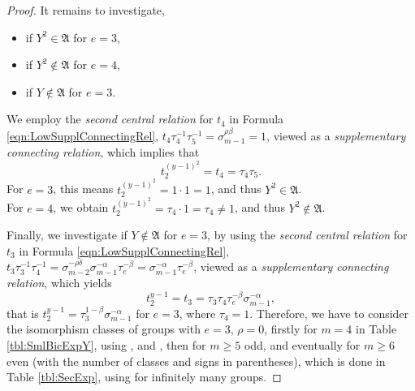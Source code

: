 \documentclass{amsart}
\theoremstyle{definition}
\numberwithin{equation}{section}
\begin{document}
\begin{proof}
It remains to investigate,

\begin{itemize}
\item
if \(Y^2\in\mathfrak{A}\) for \(e=3\),
\item
if \(Y^2\not\in\mathfrak{A}\) for \(e=4\),
\item
if \(Y\not\in\mathfrak{A}\) for \(e=3\).
\end{itemize}

\noindent
We employ the \textit{second central relation} for \(t_4\) in Formula
\eqref{eqn:LowSupplConnectingRel},
\(t_4\tau_4^{-1}\tau_5^{-1}=\sigma_{m-1}^{\rho\beta}=1\),
viewed as a \textit{supplementary connecting relation},
which implies that
\[t_2^{(y-1)^2}=t_4=\tau_4\tau_5.\]
For \(e=3\), this means
\(t_2^{(y-1)^2}=1\cdot 1=1\), and thus \(Y^2\in\mathfrak{A}\).\\
For \(e=4\), we obtain
\(t_2^{(y-1)^2}=\tau_4\cdot 1=\tau_4\ne 1\), and thus \(Y^2\not\in\mathfrak{A}\).

\noindent
Finally, we investigate
if \(Y\not\in\mathfrak{A}\) for \(e=3\),
by using the \textit{second central relation} for \(t_3\) in Formula
\eqref{eqn:LowSupplConnectingRel},
\(t_3\tau_3^{-1}\tau_4^{-1}=\sigma_{m-2}^{-\rho\delta}\sigma_{m-1}^{-\alpha}\tau_e^{-\beta}=\sigma_{m-1}^{-\alpha}\tau_e^{-\beta}\),
viewed as a \textit{supplementary connecting relation},
which yields
\[t_2^{y-1}=t_3=\tau_3\tau_4\tau_e^{-\beta}\sigma_{m-1}^{-\alpha},\]
that is \(t_2^{y-1}=\tau_3^{1-\beta}\sigma_{m-1}^{-\alpha}\) for \(e=3\), where \(\tau_4=1\).
Therefore, we have to consider the isomorphism classes of groups with \(e=3\), \(\rho=0\),
firstly for \(m=4\) in Table
\ref{tbl:SmlBicExpY},
using
\cite[p. 1--3]{Ne2},
and
\cite{BEO2},
then for \(m\ge 5\) odd, and eventually for \(m\ge 6\) even (with the number of classes and signs in parentheses),
which is done in Table
\ref{tbl:SecExp},
using
\cite[pp. 8--12]{Ne2}
for infinitely many groups.


\end{proof}
\end{document}
